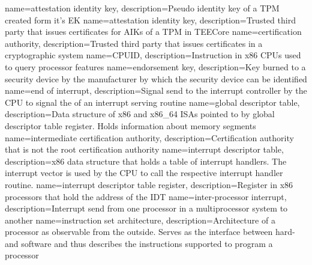 
%
{
    name=attestation identity key,
    description={Pseudo identity key of a TPM created form it's EK}
}
{
    name=attestation identity key,
    description={Trusted third party that issues certificates for AIKs of a TPM in TEECore}
}
%
{
    name=certification authority,
    description={Trusted third party that issues certificates in a cryptographic system}
}
{
    name=CPUID,
    description={Instruction in x86 CPUs used to query processor features}
}
%
{
    name=endorsement key,
    description={Key burned to a security device by the manufacturer by which the security device can be identified}
}
{
    name=end of interrupt,
    description={Signal send to the interrupt controller by the CPU to signal the of an interrupt serving routine}
}
%
{
    name=global descriptor table,
    description={Data structure of x86 and x86\_64 ISAs pointed to by global descriptor table register.
            Holds information about memory segments}
}
%
{
    name=intermediate certification authority,
    description={Certification authority that is not the root certification authority}
}
{
    name=interrupt descriptor table,
    description={x86 data structure that holds a table of interrupt handlers. The interrupt vector is used by the CPU to
            call the respective interrupt handler routine.}
}
{
    name=interrupt descriptor table register,
    description={Register in x86 processors that hold the address of the IDT}
}
{
    name=inter-processor interrupt,
    description={Interrupt send from one processor in a multiprocessor system to another}
}
{
    name=instruction set architecture,
    description={Architecture of a processor as observable from the outside. Serves as the interface between hard- and
            software and thus describes the instructions supported to program a processor}
}
